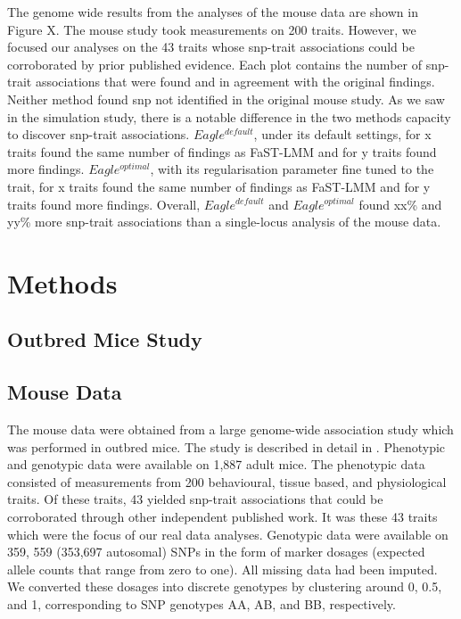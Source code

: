 \documentclass{nature}
\begin{document}
The genome wide results from the analyses of the mouse data are shown in Figure X. The mouse study took
measurements on 200 traits.  However, we focused our analyses on the 43 traits whose snp-trait associations could be
corroborated by prior published evidence. Each plot contains the number of snp-trait associations that were found and in agreement with the original findings. Neither method found snp not identified in the original mouse study.
As we saw in the simulation study, there is a notable difference in the two methods capacity to discover snp-trait associations. $Eagle^{default}$, under its default settings, for x traits found the same number of findings as FaST-LMM and for y traits found more findings. $Eagle^{optimal}$, 
with its regularisation parameter fine tuned to the trait, for x traits found the same number of findings as FaST-LMM and for y traits 
found more findings. Overall, $Eagle^{default}$ and $Eagle^{optimal}$ found xx\% and yy\% more snp-trait associations than a 
single-locus analysis of the mouse data. 



\section{Methods}

\subsection{Outbred Mice Study}
\subsection{Mouse Data}

The mouse data were obtained from a large genome-wide association study which was performed in outbred mice. 
The study is described in detail in \cite{nicod2016genome}. Phenotypic and genotypic data were available on 1,887 adult mice. 
The phenotypic data consisted of measurements from 200 behavioural, tissue based, and physiological traits.  Of these traits, 
43 yielded snp-trait associations that could be corroborated through other independent published work. It was these 
43 traits which were the focus of our real data analyses. Genotypic data were available on 359, 559 (353,697 autosomal) SNPs in the 
form of marker dosages (expected allele counts that range from zero to one). All missing data had been imputed. 
We converted these  dosages into discrete genotypes 
by clustering around 0, 0.5, and 1, corresponding to SNP genotypes AA, AB, and BB, respectively. 
\end{document}
